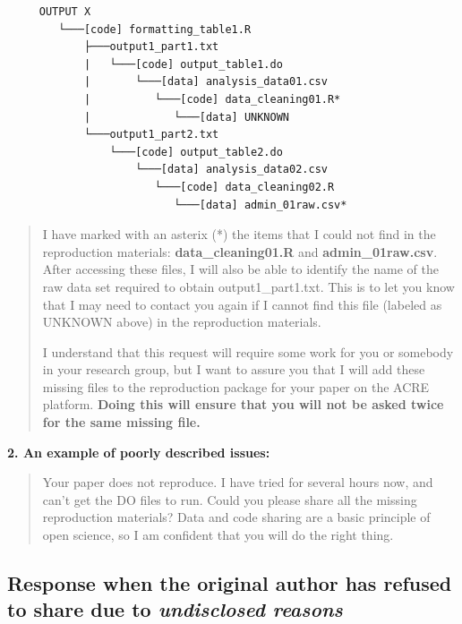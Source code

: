 \documentclass[]{book}
\begin{document}
\begin{verbatim}
     OUTPUT X
        └───[code] formatting_table1.R
            ├───output1_part1.txt  
            |   └───[code] output_table1.do           
            |       └───[data] analysis_data01.csv
            |          └───[code] data_cleaning01.R*
            |             └───[data] UNKNOWN
            └───output1_part2.txt  
                └───[code] output_table2.do           
                    └───[data] analysis_data02.csv
                       └───[code] data_cleaning02.R
                          └───[data] admin_01raw.csv* 
\end{verbatim}

\begin{quote}
I have marked with an asterix (*) the items that I could not find in the reproduction materials: \textbf{data\_cleaning01.R} and \textbf{admin\_01raw.csv}. After accessing these files, I will also be able to identify the name of the raw data set required to obtain output1\_part1.txt. This is to let you know that I may need to contact you again if I cannot find this file (labeled as UNKNOWN above) in the reproduction materials.

I understand that this request will require some work for you or somebody in your research group, but I want to assure you that I will add these missing files to the reproduction package for your paper on the ACRE platform. \textbf{Doing this will ensure that you will not be asked twice for the same missing file.}
\end{quote}

\textbf{2. An example of poorly described issues:}

\begin{quote}
Your paper does not reproduce. I have tried for several hours now, and can't get the DO files to run. Could you please share all the missing reproduction materials? Data and code sharing are a basic principle of open science, so I am confident that you will do the right thing.
\end{quote}

\hypertarget{response-when-the-original-author-has-refused-to-share-due-to-undisclosed-reasons}{%
\subsection{\texorpdfstring{Response when the original author has refused to share due to \emph{undisclosed reasons}}{Response when the original author has refused to share due to undisclosed reasons}}\label{response-when-the-original-author-has-refused-to-share-due-to-undisclosed-reasons}}
\end{document}
